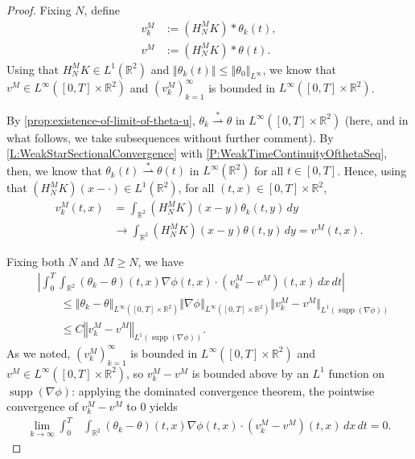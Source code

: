 \documentclass[11pt,reqno,xcolor=svgnames]{amsart}
\def\R{{\mathbb R}}
\theoremstyle{plain}
\theoremstyle{definition}
\theoremstyle{plain}
\theoremstyle{remark}
\newcommand{\abs}[1]{\left\vert#1\right\vert}
\DeclareMathOperator{\supp}{supp}
\newcommand{\iny}{\ensuremath{\infty}}
\newcommand{\grad}{\ensuremath{\nabla}}
\newcommand{\norm}[1]{\ensuremath{\left\Vert #1 \right\Vert}}
\newcommand{\smallnorm}[1]{\ensuremath{\Vert #1 \Vert}}
\newcommand{\wstar}{\overset{*}{\rightharpoonup}}
\begin{document}
\begin{proof}
    Fixing $N$, define
    \begin{align*}
        v_k^M &:= (H_N^M K) * \theta_k(t), \\
        v^M &:= (H_N^M K) * \theta(t).
    \end{align*}
    Using that $H_N^M K \in L^1(\R^2)$ and $\norm{\theta_k(t)} \le \norm{\theta_0}_{L^\iny}$, we know that $v^M \in L^\iny([0, T] \times \R^2)$ and $(v_k^M)_{k = 1}^\iny$ is bounded in $L^\iny([0, T] \times \R^2)$.

    By \cref{prop:existence-of-limit-of-theta-u}, $\theta_k \wstar \theta$ in $L^\iny([0, T] \times \R^2)$ (here, and in what follows, we take subsequences without further comment). By \cref{L:WeakStarSectionalConvergence} with \cref{P:WeakTimeContinuityOfthetaSeq}, then, we know that $\theta_k(t) \wstar \theta(t)$ in $L^\iny(\R^2)$ for all $t \in [0, T]$. Hence, using that $(H_N^M K)(x - \cdot) \in L^1(\R^2)$, for all $(t, x) \in [0, T] \times \R^2$,
    \begin{align*}        
        v_k^M(t, x)
            &= \int_{\R^2} (H_N^M K)(x - y) \theta_k(t, y)
                \, dy \\
            &\to \int_{\R^2} (H_N^M K)(x - y) \theta(t, y)
                \, dy
            = v^M(t, x).
    \end{align*}

    Fixing both $N$ and $M \ge N$, we have
    \begin{align*}
        &\abs{\int_0^T \int_{\R^2} (\theta_k - \theta)(t, x)
            \grad \phi(t,x) \cdot (v_k^M - v^M)(t, x)
            \, dx \, dt } \\
        &\qquad
        \le \norm{\theta_k - \theta}_{L^\iny([0, T] \times \R^2)}
        \norm{\grad \phi}_{L^\iny([0, T] \times \R^2)}
        \smallnorm{v_k^M - v^M}_{L^1(\supp(\grad \phi))} \\
        &\qquad
        \le C \norm{v_k^M - v^M}_{L^1(\supp(\grad \phi))}.
    \end{align*} 
    As we noted, $(v_k^M)_{k = 1}^\iny$ is bounded in $L^\iny([0, T] \times \R^2)$ and $v^M \in L^\iny([0, T] \times \R^2)$, so $v_k^M - v^M$ is bounded above by an $L^1$ function on $\supp(\grad \phi)$: applying the dominated convergence theorem, the pointwise convergence of $v_k^M - v^M$ to 0
    yields
    \begin{align}\label{e:vkMLimitInk}
        \lim_{k \to \iny} \int_0^T &\int_{\R^2}
        	(\theta_k - \theta)(t,x)
            \nabla\phi(t,x) \cdot (v_k^M - v^M)(t, x)
                \, dx \, dt
            = 0.
    \end{align}



\end{proof}
\end{document}
